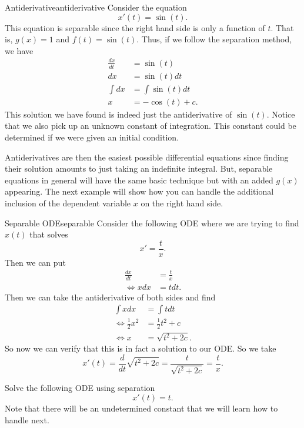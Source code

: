 \begin{ex}{Antiderivative}{antiderivative}
    Consider the equation
    \[
        x'(t) = \sin(t).
    \]
    This equation is separable since the right hand side is only a function of $t$. That is, $g(x)=1$ and $f(t)=\sin(t)$.  Thus, if we follow the separation method, we have
    \begin{align*}
        \frac{dx}{dt} &= \sin(t)\\
        dx &= \sin(t) dt\\
        \int dx &= \int \sin(t) dt\\
        x&= -\cos(t) + c.
    \end{align*}
    This solution we have found is indeed just the antiderivative of $\sin(t)$. Notice that we also pick up an unknown constant of integration. This constant could be determined if we were given an initial condition.
\end{ex}

Antiderivatives are then the easiest possible differential equations since finding their solution amounts to just taking an indefinite integral.  But, separable equations in general will have the same basic technique but with an added $g(x)$ appearing.  The next example will show how you can handle the additional inclusion of the dependent variable $x$ on the right hand side.

        \begin{ex}{Separable ODE}{separable}
        Consider the following ODE where we are trying to find $x(t)$ that solves
        \[
        x'=\frac{t}{x}.
        \]
        Then we can put
        \begin{align*}
            \frac{dx}{dt}&= \frac{t}{x}\\
            \iff xdx &= t dt.
        \end{align*}
        Then we can take the antiderivative of both sides and find
        \begin{align*}
            \int xdx &= \int t dt\\
            \iff \frac{1}{2}x^2 &= \frac{1}{2}t^2 + c\\
            \iff x&=\sqrt{t^2+2c}.
        \end{align*}
        So now we can verify that this is in fact a solution to our ODE.  So we take
        \[
        x'(t) = \frac{d}{dt}\sqrt{t^2+2c}= \frac{t}{\sqrt{t^2+2c}} = \frac{t}{x}.
        \]
        \end{ex}

        \begin{exercise}
        Solve the following ODE using separation
        \[
        x'(t)=t.
        \]
        Note that there will be an undetermined constant that we will learn how to handle next.
        \end{exercise}


